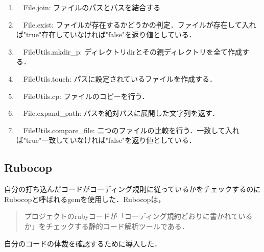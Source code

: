 \begin{enumerate}
\def\labelenumi{\arabic{enumi}.}
\tightlist
\item
　File.join: ファイルのパスとパスを結合する
\item
　File.exist: ファイルが存在するかどうかの判定．ファイルが存在して入れば"true"存在していなければ"false"を返り値としている．
\item
　FileUtils.mkdir\_p: ディレクトリdirとその親ディレクトリを全て作成する．
\item
　FileUtils.touch: パスに設定されているファイルを作成する．
\item
　FileUtils.cp: ファイルのコピーを行う．
\item
　File.expand\_path: パスを絶対パスに展開した文字列を返す．
\item
　FileUtils.compare\_file: 二つのファイルの比較を行う．一致して入れば"true"一致していなければ"false"を返り値としている．
\end{enumerate}

    \subsection{Rubocop}\label{rubocop}

自分の打ち込んだコードがコーディング規則に従っているかをチェックするのにRubocopと呼ばれるgemを使用した．Rubocopは，
\begin{quotation}
プロジェクトのrubyコードが「コーディング規約どおりに書かれているか」をチェックする静的コード解析ツールである\cite{rubocop}．
\end{quotation}
自分のコードの体裁を確認するために導入した．
